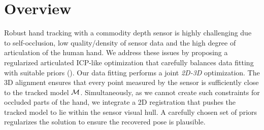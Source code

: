 \section{Overview}
Robust hand tracking with a commodity depth sensor is highly challenging due to self-occlusion, low quality/density of sensor data and the high degree of articulation of the human hand.
We address these issues by proposing a regularized articulated ICP-like optimization that carefully balances data fitting with suitable priors (). 
%
Our data fitting performs a joint \emph{2D-3D} optimization. 
The 3D alignment ensures that every point measured by the sensor is sufficiently close to the tracked model $\mathcal{M}$.
Simultaneously, as we cannot create such constraints for occluded parts of the hand, we integrate a 2D registration that pushes the tracked model to lie within the sensor visual hull. A carefully chosen set of priors regularizes the solution to ensure the recovered pose is plausible. 



